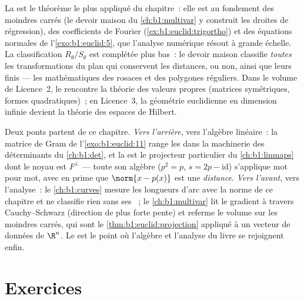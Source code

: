 \begin{remark}
\label{rem:b1:euclid:whereused}
La  est le théorème le plus appliqué du
chapitre~: elle est au fondement des moindres carrés (le devoir
maison du \cref{ch:b1:multivar} y construit les droites de
régression), des coefficients de Fourier
(\cref{ex:b1:euclid:trigortho}) et des équations normales de
l'\cref{exo:b1:euclid:5}, que l'analyse numérique résout à grande
échelle. La classification $R_\theta / S_\theta$ est complétée
plus bas~: le devoir maison classifie \emph{toutes} les
transformations du plan qui conservent les distances,  ou
non, ainsi que leurs  finis --- les mathématiques des
rosaces et des polygones réguliers. Dans le volume de Licence~2, le
 rencontre la théorie des valeurs propres (matrices
symétriques, formes quadratiques)~; en Licence~3, la géométrie
euclidienne en dimension infinie devient la théorie des espaces de
Hilbert.
\end{remark}

\begin{remark}
\label{rem:b1:euclid:perspectives}
Deux ponts partent de ce chapitre. \emph{Vers l'arrière}, vers
l'algèbre linéaire~: la matrice de Gram de l'\cref{exo:b1:euclid:11}
range les  dans la machinerie des déterminants du
\cref{ch:b1:det}, et la  est le projecteur
particulier du \cref{ch:b1:linmaps} dont le noyau est
$F^\perp$ --- toute son algèbre ($p^2 = p$, $s = 2p -
\mathrm{id}$) s'applique mot pour mot, avec en prime que $\norm{x
- p(x)}$ est une \emph{distance}. \emph{Vers l'avant}, vers
l'analyse~: le \cref{ch:b1:curves} mesure les longueurs d'arc avec la
norme de ce chapitre et ne classifie rien sans ses ~;
le \cref{ch:b1:multivar} lit le gradient à travers Cauchy--Schwarz
(direction de plus forte pente) et referme le volume sur les
moindres carrés, qui sont le \cref{thm:b1:euclid:projection} appliqué
à un vecteur de données de $\R^n$. Le  est le point
où l'algèbre et l'analyse du livre se rejoignent enfin.
\end{remark}

\section{Exercices}

